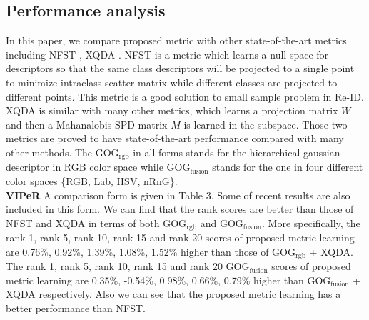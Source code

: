 \documentclass[conference,compsoc]{IEEEtran}
\begin{document}
\subsection{Performance analysis}
In this paper, we compare proposed metric with other state-of-the-art metrics including NFST \cite{NFST}, XQDA \cite{LOMO}. NFST is a metric which learns a null space for descriptors so that the same class descriptors will be projected to a single point to minimize intraclass scatter matrix while different classes are projected to different points. This metric is a good solution to small sample problem in Re-ID. XQDA is similar with many other metrics, which learns a projection matrix $W$ and then a Mahanalobis SPD matrix $M$ is learned in the subspace. Those two metrics are proved to have state-of-the-art performance compared with many other methods. The GOG$_\text{rgb}$ in all forms stands for the hierarchical gaussian descriptor in RGB color space while GOG$_\text{fusion}$ stands for the one in four different color spaces \{RGB, Lab, HSV, nRnG\}.\\
\textbf{VIPeR} A comparison form is given in Table 3. Some of recent results are also included in this form. We can find that the rank scores are better than those of NFST and XQDA in terms of both GOG$_\text{rgb}$ and GOG$_\text{fusion}$. More specifically, the rank 1, rank 5, rank 10, rank 15 and rank 20 scores of proposed metric learning are 0.76\%, 0.92\%, 1.39\%, 1.08\%, 1.52\% higher than those of GOG$_\text{rgb}$ + XQDA. The rank 1, rank 5, rank 10, rank 15 and rank 20 GOG$_\text{fusion}$ scores of proposed metric learning are 0.35\%, -0.54\%, 0.98\%, 0.66\%, 0.79\% higher than GOG$_\text{fusion}$ + XQDA respectively. Also we can see that the proposed metric learning has a better performance than NFST. 
\end{document}
